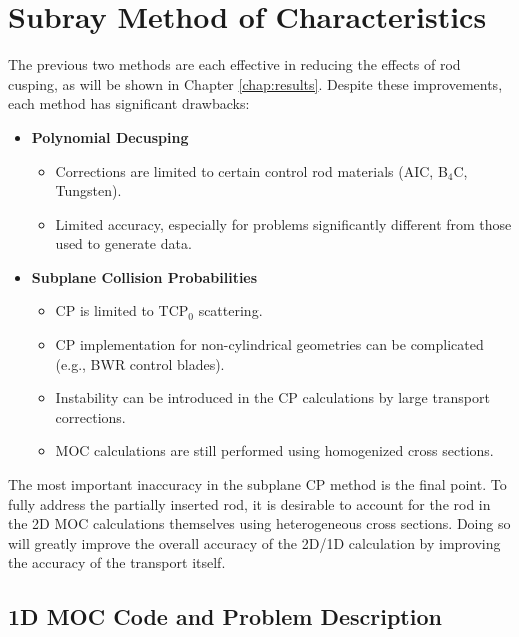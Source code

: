 \section{Subray Method of Characteristics}

The previous two methods are each effective in reducing the effects of rod cusping, as will be shown in Chapter \ref{chap:results}.  Despite these improvements, each method has significant drawbacks:
\begin{itemize}[leftmargin=*]
    \item \textbf{Polynomial Decusping}
    
    \begin{itemize}
        \item Corrections are limited to certain control rod materials (AIC, B$_4$C, Tungsten).
        \item Limited accuracy, especially for problems significantly different from those used to generate data.
    \end{itemize}

    \item \textbf{Subplane Collision Probabilities}
    
    \begin{itemize}
        \item CP is limited to TCP$_0$ scattering.
        \item CP implementation for non-cylindrical geometries can be complicated (e.g., BWR control blades).
        \item Instability can be introduced in the CP calculations by large transport corrections.
        \item MOC calculations are still performed using homogenized cross sections.
    \end{itemize}
\end{itemize}
The most important inaccuracy in the subplane CP method is the final point.  To fully address the partially inserted rod, it is desirable to account for the rod in the 2D MOC calculations themselves using heterogeneous cross sections.  Doing so will greatly improve the overall accuracy of the 2D/1D calculation by improving the accuracy of the transport itself.

\subsection{1D MOC Code and Problem Description}\label{ss:1dcode}

